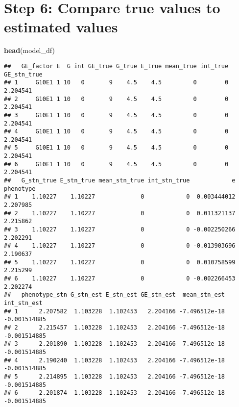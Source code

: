 \documentclass[]{article}
\newenvironment{Shaded}{\begin{snugshade}}{\end{snugshade}}
\newcommand{\KeywordTok}[1]{\textcolor[rgb]{0.13,0.29,0.53}{\textbf{#1}}}
\newcommand{\NormalTok}[1]{#1}
\newcommand{\OperatorTok}[1]{\textcolor[rgb]{0.81,0.36,0.00}{\textbf{#1}}}
\newcommand{\StringTok}[1]{\textcolor[rgb]{0.31,0.60,0.02}{#1}}
\begin{document}
\hypertarget{step-6-compare-true-values-to-estimated-values}{%
\section{Step 6: Compare true values to estimated
values}\label{step-6-compare-true-values-to-estimated-values}}

\begin{Shaded}
\begin{Highlighting}[]
\KeywordTok{head}\NormalTok{(model_df)}
\end{Highlighting}
\end{Shaded}

\begin{verbatim}
##   GE_factor E  G int GE_true G_true E_true mean_true int_true GE_stn_true
## 1     G10E1 1 10   0       9    4.5    4.5         0        0    2.204541
## 2     G10E1 1 10   0       9    4.5    4.5         0        0    2.204541
## 3     G10E1 1 10   0       9    4.5    4.5         0        0    2.204541
## 4     G10E1 1 10   0       9    4.5    4.5         0        0    2.204541
## 5     G10E1 1 10   0       9    4.5    4.5         0        0    2.204541
## 6     G10E1 1 10   0       9    4.5    4.5         0        0    2.204541
##   G_stn_true E_stn_true mean_stn_true int_stn_true            e phenotype
## 1    1.10227    1.10227             0            0  0.003444012  2.207985
## 2    1.10227    1.10227             0            0  0.011321137  2.215862
## 3    1.10227    1.10227             0            0 -0.002250266  2.202291
## 4    1.10227    1.10227             0            0 -0.013903696  2.190637
## 5    1.10227    1.10227             0            0  0.010758599  2.215299
## 6    1.10227    1.10227             0            0 -0.002266453  2.202274
##   phenotype_stn G_stn_est E_stn_est GE_stn_est  mean_stn_est  int_stn_est
## 1      2.207582  1.103228  1.102453   2.204166 -7.496512e-18 -0.001514885
## 2      2.215457  1.103228  1.102453   2.204166 -7.496512e-18 -0.001514885
## 3      2.201890  1.103228  1.102453   2.204166 -7.496512e-18 -0.001514885
## 4      2.190240  1.103228  1.102453   2.204166 -7.496512e-18 -0.001514885
## 5      2.214895  1.103228  1.102453   2.204166 -7.496512e-18 -0.001514885
## 6      2.201874  1.103228  1.102453   2.204166 -7.496512e-18 -0.001514885
\end{verbatim}

\begin{Shaded}
\end{Shaded}
\end{document}
